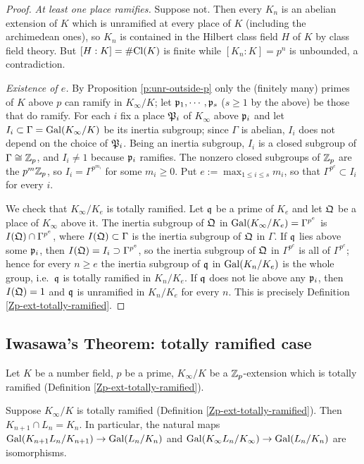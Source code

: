 \begin{proof}
\emph{At least one place ramifies.}
Suppose not. Then every $K_n$ is an abelian extension of $K$ which is unramified
at every place of $K$ (including the archimedean ones), so $K_n$ is contained in
the Hilbert class field $H$ of $K$ by class field theory.
But $[H:K]=\#{\mathrm{Cl}}(K)$ is finite while $[K_n:K]=p^n$ is unbounded, a contradiction.

\emph{Existence of $e$.}
By Proposition \ref{p:unr-outside-p} only the (finitely many) primes of $K$ above
$p$ can ramify in $K_\infty/K$; let ${\mathfrak{p}}_1,\cdots,{\mathfrak{p}}_s$ ($s\geq 1$ by the above)
be those that do ramify.
For each $i$ fix a place ${\mathfrak{P}}_i$ of $K_\infty$ above ${\mathfrak{p}}_i$ and let
$I_i\subset\Gamma={\mathrm{Gal}}(K_\infty/K)$ be its inertia subgroup; since $\Gamma$ is
abelian, $I_i$ does not depend on the choice of ${\mathfrak{P}}_i$.
Being an inertia subgroup, $I_i$ is a closed subgroup of $\Gamma\cong{\mathbb {Z}}_p$,
and $I_i\neq 1$ because ${\mathfrak{p}}_i$ ramifies.
The nonzero closed subgroups of ${\mathbb {Z}}_p$ are the $p^m{\mathbb {Z}}_p$, so
$I_i=\Gamma^{p^{m_i}}$ for some $m_i\geq 0$.
Put $e:=\max_{1\leq i\leq s}m_i$, so that $\Gamma^{p^e}\subset I_i$ for every $i$.

We check that $K_\infty/K_e$ is totally ramified.
Let ${\mathfrak{q}}$ be a prime of $K_e$ and let ${\mathfrak{Q}}$ be a place of $K_\infty$ above it.
The inertia subgroup of ${\mathfrak{Q}}$ in ${\mathrm{Gal}}(K_\infty/K_e)=\Gamma^{p^e}$ is
$I({\mathfrak{Q}})\cap\Gamma^{p^e}$, where $I({\mathfrak{Q}})\subset\Gamma$ is the inertia subgroup of
${\mathfrak{Q}}$ in $\Gamma$.
If ${\mathfrak{q}}$ lies above some ${\mathfrak{p}}_i$, then $I({\mathfrak{Q}})=I_i\supset\Gamma^{p^e}$, so the
inertia subgroup of ${\mathfrak{Q}}$ in $\Gamma^{p^e}$ is all of $\Gamma^{p^e}$; hence for
every $n\geq e$ the inertia subgroup of ${\mathfrak{q}}$ in ${\mathrm{Gal}}(K_n/K_e)$ is the whole
group, i.e.~${\mathfrak{q}}$ is totally ramified in $K_n/K_e$.
If ${\mathfrak{q}}$ does not lie above any ${\mathfrak{p}}_i$, then $I({\mathfrak{Q}})=1$ and ${\mathfrak{q}}$ is unramified
in $K_n/K_e$ for every $n$.
This is precisely Definition \ref{Zp-ext-totally-ramified}.
\end{proof}

\subsection{Iwasawa's Theorem: totally ramified case}

Let $K$ be a number field, $p$ be a prime,
$K_\infty/K$ be a ${\mathbb {Z}}_p$-extension which is totally ramified
(Definition \ref{Zp-ext-totally-ramified}).

\begin{lem}
\label{isom-of-totally-ramified}
Suppose $K_\infty/K$ is totally ramified
(Definition \ref{Zp-ext-totally-ramified}).
Then $K_{n+1}\cap L_n=K_n$. In particular,
the natural maps
${\mathrm{Gal}}(K_{n+1}L_n/K_{n+1})\to{\mathrm{Gal}}(L_n/K_n)$ and
${\mathrm{Gal}}(K_\infty L_n/K_\infty)\to{\mathrm{Gal}}(L_n/K_n)$
are isomorphisms.
\end{lem}

